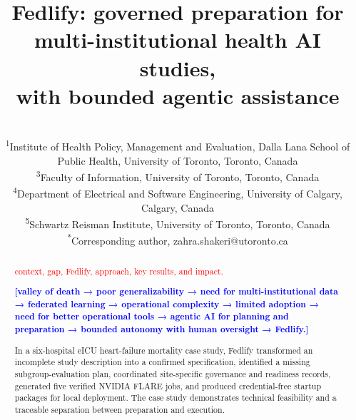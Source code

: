 \documentclass[preprint,5p, 10pt, times]{elsarticle}
\begin{document}
\sloppy

\begin{frontmatter}

\title{\Large \bf Fedlify: governed preparation for multi-institutional health AI studies, \\with bounded agentic assistance}

\author{
    \textbf{\fontsize{11pt}{13.3pt}} 
    \\
    \small\normalfont
    \textsuperscript{1}{Institute of Health Policy, Management and Evaluation, Dalla Lana School of Public Health, University of Toronto, Toronto, Canada} \\
    \textsuperscript{3}{Faculty of Information, University of Toronto, Toronto, Canada} \\
\textsuperscript{4}{Department of Electrical and Software Engineering, University of Calgary, Calgary, Canada} \\
\textsuperscript{5}{Schwartz Reisman Institute, University of Toronto, Toronto, Canada} \\
    \textsuperscript{*}{Corresponding author, zahra.shakeri@utoronto.ca}
}


\begin{abstract}
\centering\begin{minipage}{\dimexpr\paperwidth-3cm}


\textcolor{red}{context, gap, Fedlify, approach, key results, and impact.}

\textcolor{blue}{\textbf{[valley of death → poor generalizability → need for multi-institutional data → federated learning → operational complexity → limited adoption → need for better operational tools → agentic AI for planning and preparation → bounded autonomy with human oversight → Fedlify.]
}}

In a six-hospital eICU heart-failure mortality case study, Fedlify transformed an incomplete study description into a confirmed specification, identified a missing subgroup-evaluation plan, coordinated site-specific governance and readiness records, generated five verified NVIDIA FLARE jobs, and produced credential-free startup packages for local deployment. The case study demonstrates technical feasibility and a traceable separation between preparation and execution.

\end{minipage}

\end{abstract}


\end{frontmatter}
\end{document}
